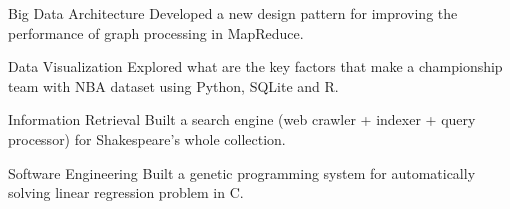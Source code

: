 \begin{cvskills}

  \cvskill
    {Big Data Architecture} %
    {Developed a new design pattern for improving the performance of graph
    processing in MapReduce.} %

  \cvskill
    {Data Visualization} %
    {Explored what are the key factors that make a championship team
    with NBA dataset using Python, SQLite and R.} %

  \cvskill
    {Information Retrieval} %
    {Built a search engine (web crawler + indexer + query
    processor) for Shakespeare's whole collection.} %

  \cvskill
    {Software Engineering} %
    {Built a genetic programming system for automatically solving
    linear regression problem in C.}

\end{cvskills}
